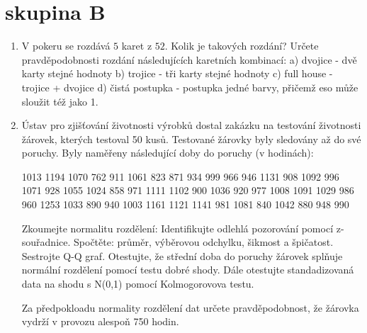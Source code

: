 \documentclass[a4paper,10pt]{article}
\begin{document}
\section*{skupina B}
\begin{enumerate}
  \item V pokeru se rozdává $5$ karet z $52$. Kolik je takových rozdání? Určete pravděpodobnosti rozdání následujících karetních kombinací: a) dvojice - dvě karty stejné hodnoty b) trojice - tři karty stejné hodnoty c) full house - trojice + dvojice d) čistá postupka - postupka jedné barvy, přičemž eso může sloužit též jako 1.

  \item Ústav pro zjišťování životnosti výrobků dostal zakázku na testování životnosti žárovek, kterých testoval 50 kusů.
  Testované žárovky byly sledovány až do své poruchy. Byly naměřeny následující doby do poruchy (v hodinách):

 1013   1194    1070    762     911     1061    823     871     934     999     966     946     1131    908     1092    996     1071    928     1055    1024    858     971     1111    1102    900     1036    920     977     1008    1091    1029    986     960     1253    1033    890     940     1003    1161    1121    1141    981     1081    840     1042    880     948     990

  Zkoumejte normalitu rozdělení: Identifikujte odlehlá pozorování pomocí z-souřadnice. Spočtěte: průměr, výběrovou odchylku, šikmost a špičatost. Sestrojte Q-Q graf.
  Otestujte, že střední doba do poruchy žárovek splňuje normální rozdělení pomocí testu dobré shody. Dále otestujte standadizovaná data na shodu s N(0,1) pomocí Kolmogorovova testu.

  Za předpokloadu normality rozdělení dat určete pravděpodobnost, že žárovka vydrží v provozu alespoň 750 hodin.
\end{enumerate}
\pagebreak
\end{document}
